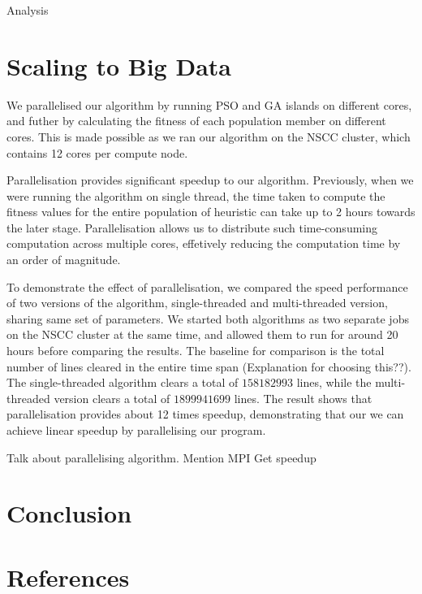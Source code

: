 \documentclass{article}
\begin{document}
    Analysis

    \section{Scaling to Big Data}
	We parallelised our algorithm by running PSO and GA islands on different cores, and
	futher by calculating the fitness of each population member on different cores. This is made possible
	as we ran our algorithm on the NSCC cluster, which contains 12 cores per compute node.

	Parallelisation provides significant speedup to our algorithm. Previously, when we were running the algorithm
	on single thread, the time taken to compute the fitness values for the entire population of heuristic can take
	up to 2 hours towards the later stage. Parallelisation allows us to distribute such time-consuming computation
	across multiple cores, effetively reducing the computation time by an order of magnitude.

	To demonstrate the effect of parallelisation, we compared the speed performance of two versions of the algorithm,
	single-threaded and multi-threaded version, sharing same set of parameters. We started both algorithms as two separate jobs on the NSCC cluster
	at the same time, and allowed them to run for around 20 hours before comparing the results. The baseline for comparison
	is the total number of lines cleared in the entire time span (Explanation for choosing this??).
	The single-threaded algorithm clears a total of $158182993$ lines, while the multi-threaded version clears a total of $1899941699$ lines. The result shows that parallelisation provides
	about 12 times speedup, demonstrating that our we can achieve linear speedup by parallelising our program.




    Talk about parallelising algorithm. Mention MPI
    Get speedup

    \section{Conclusion}


    \section{References}
\end{document}

